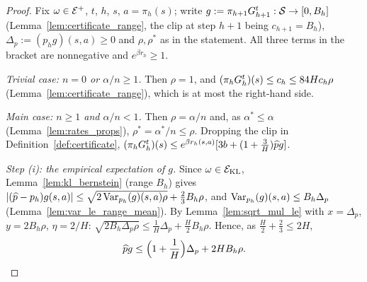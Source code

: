 \begin{proof}
\leanok
Fix $\omega \in \mathcal{E}^+$, $t$, $h$, $s$, $a = \pi_h(s)$; write $g := \pi_{h+1}G^t_{h+1} : \mathcal{S} \to [0, B_h]$
(Lemma~\ref{lem:certificate_range}, the clip at step $h + 1$ being $c_{h+1} = B_h$),
$\Delta_p := (p_h g)(s,a) \ge 0$ and $\rho, \rho^*$ as in the statement. All three terms in the
bracket are nonnegative and $e^{\beta r_h} \ge 1$.

\emph{Trivial case: $n = 0$ or $\alpha/n \ge 1$.} Then $\rho = 1$, and $(\pi_hG_h^t)(s) \le c_h \le 84 H c_h \rho$
(Lemma~\ref{lem:certificate_range}), which is at most the right-hand side.

\emph{Main case: $n \ge 1$ and $\alpha/n < 1$.} Then $\rho = \alpha/n$ and, as $\alpha^* \le \alpha$
(Lemma~\ref{lem:rates_props}), $\rho^* = \alpha^*/n \le \rho$. Dropping the clip in
Definition~\ref{def:certificate}, $(\pi_hG_h^t)(s) \le e^{\beta r_h(s,a)}[3b + (1 + \frac3H)\widehat{p} g]$.

\emph{Step (i): the empirical expectation of $g$.} Since $\omega \in \mathcal{E}_{\mathrm{KL}}$,
Lemma~\ref{lem:kl_bernstein} (range $B_h$) gives
$\lvert (\widehat{p} - p_h) g(s,a) \rvert \le \sqrt{2\operatorname{Var}_{p_h}(g)(s,a)\rho} + \frac23 B_h\rho$, and
$\operatorname{Var}_{p_h}(g)(s,a) \le B_h\Delta_p$ (Lemma~\ref{lem:var_le_range_mean}). By
Lemma~\ref{lem:sqrt_mul_le} with $x = \Delta_p$, $y = 2B_h\rho$, $\eta = 2/H$:
$\sqrt{2B_h\Delta_p\rho} \le \frac1H\Delta_p + \frac{H}{2}B_h\rho$. Hence, as $\frac H2 + \frac23 \le 2H$,
\[
  \widehat{p} g \le \Big(1 + \frac1H\Big)\Delta_p + 2 H B_h \rho .
\]


\end{proof}
